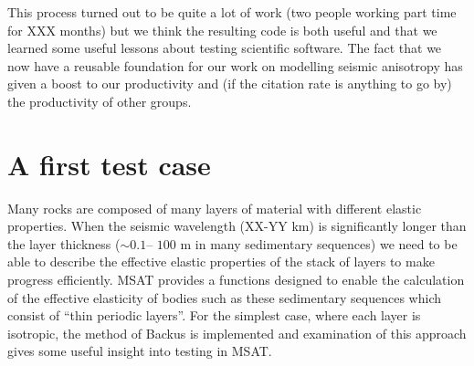 \documentclass[11pt, oneside]{article}   	%
\begin{document}
This process turned out to be quite a lot of work (two people working part time
for XXX months) but we think the resulting code is both useful and that we 
learned some useful lessons about testing scientific software. The fact that 
we now have a reusable foundation for our work on modelling seismic  
anisotropy has given a boost to our productivity and 
(if the citation rate is anything to go by) the productivity of other groups.


\section{A first test case}

Many rocks are composed of many layers of material with different elastic properties. When
the seismic wavelength (XX-YY km) is significantly longer than the layer thickness ($\sim0.1$--
$100$ m in many sedimentary sequences) we need to be able to describe the effective elastic
properties of the stack of layers to make progress efficiently. MSAT provides a functions designed
to enable the calculation of the effective elasticity of bodies such as these sedimentary sequences
which consist of ``thin periodic layers''. For the simplest case, where each layer is isotropic, the 
method of Backus \cite{Backus1962} is implemented and examination of this approach gives some
useful insight into testing in MSAT.
\end{document}
